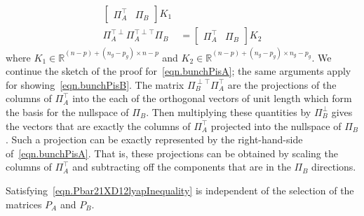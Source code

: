 \begin{proof-dan}
\begin{align}
\begin{bmatrix}
      \Pi_{A}^{\top} & \Pi_{B}
    \end{bmatrix}K_{1} \\
    \label{eqn.bunchPisB}
    \Pi_{A}^{\top\perp}\Pi_{A}^{\top\perp\top}\Pi_{B}
    &=
    \begin{bmatrix}
      \Pi_{A}^{\top} & \Pi_{B}
    \end{bmatrix}K_{2}
  \end{align}
  where $K_{1}\in\mathbb{R}^{(n-p)+(n_{g}-p_{g})\times n-p}$ and $K_{2}\in\mathbb{R}^{(n-p)+(n_{g}-p_{g})\times n_{g}-p_{g}}$.
  We continue the sketch of the proof for\ \eqref{eqn.bunchPisA}; the same arguments apply for showing\ \eqref{eqn.bunchPisB}.
  The matrix $\Pi_{B}^{\perp\top}\Pi_{A}^{\top}$ are the projections of the columns of $\Pi_{A}^{\top}$ into the each of the orthogonal vectors of unit length which form the basis for the nullspace of $\Pi_{B}$.
  Then multiplying these quantities by $\Pi_{B}^{\perp}$ gives the vectors that are exactly the columns of $\Pi_{A}^{\top}$ projected into the nullspace of $\Pi_{B}$.
  Such a projection can be exactly represented by the right-hand-side of\ \eqref{eqn.bunchPisA}.
  That is, these projections can be obtained by scaling the columns of $\Pi_{A}^{\top}$ and subtracting off the components that are in the $\Pi_{B}$ directions.
\end{proof-dan}

\begin{lem-dan}
  Satisfying\ \eqref{eqn.Pbar21XD12lyapInequality} is independent of the selection of the matrices $P_{A}$ and $P_{B}$.
\end{lem-dan}

